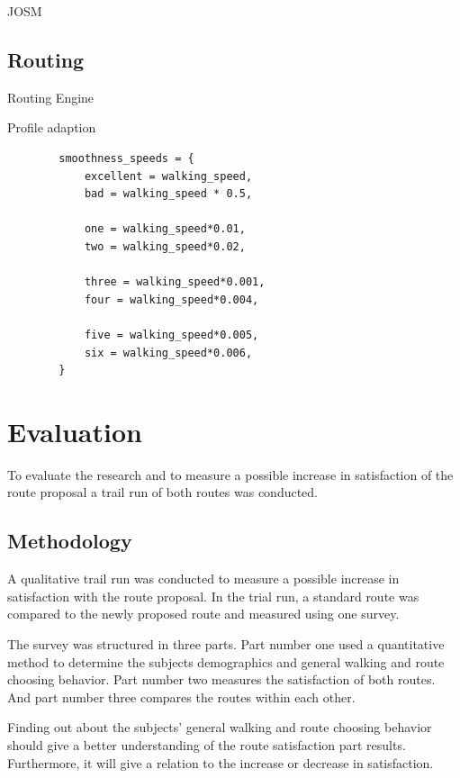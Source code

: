 JOSM




\subsection{Routing}

Routing Engine

Profile adaption

\begin{lstlisting}
        smoothness_speeds = {
            excellent = walking_speed,
            bad = walking_speed * 0.5,

            one = walking_speed*0.01,
            two = walking_speed*0.02,

            three = walking_speed*0.001,
            four = walking_speed*0.004,
            
            five = walking_speed*0.005,
            six = walking_speed*0.006,
        }
\end{lstlisting}

\autocite[]{Delling2012}


\section{Evaluation}

To evaluate the research and to measure a possible increase in satisfaction of the route proposal a trail run of both routes was conducted.

\subsection{Methodology}

A qualitative trail run was conducted to measure a possible increase in satisfaction with the route proposal. In the trial run, a standard route was compared to the newly proposed route and measured using one survey. 

The survey was structured in three parts. Part number one used a quantitative method to determine the subjects demographics and general walking and route choosing behavior. Part number two measures the satisfaction of both routes. And part number three compares the routes within each other.

Finding out about the subjects' general walking and route choosing behavior should give a better understanding of the route satisfaction part results. Furthermore, it will give a relation to the increase or decrease in satisfaction.





